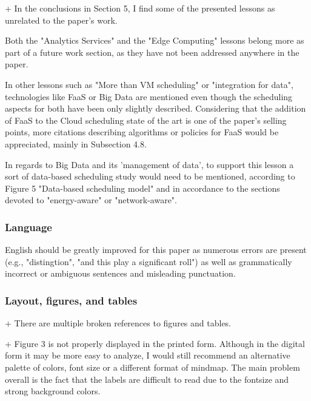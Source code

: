 + In the conclusions in Section 5, I find some of the presented lessons as unrelated to the paper's work.

Both the "Analytics Services" and the "Edge Computing" lessons belong more as part of a future work section, as they have not been addressed anywhere in the paper.



In other lessons such as "More than VM scheduling" or "integration for data", technologies like FaaS or Big Data are mentioned even though the scheduling aspects for both have been only slightly described. Considering that the addition of FaaS to the Cloud scheduling state of the art is one of the paper's selling points, more citations describing algorithms or policies for FaaS would be appreciated, mainly in Subsection 4.8.


In regards to Big Data and its 'management of data', to support this lesson a sort of data-based scheduling study would need to be mentioned, according to Figure 5 "Data-based scheduling model" and in accordance to the sections devoted to "energy-aware" or "network-aware".




\subsubsection{Language}

English should be greatly improved for this paper as numerous errors are present (e.g., "distingtion", "and this play a significant roll") as well as grammatically incorrect or ambiguous sentences and misleading punctuation.



\subsubsection{Layout, figures, and tables}

+ There are multiple broken references to figures and tables.


+ Figure 3 is not properly displayed in the printed form. Although in the digital form it may be more easy to analyze, I would still recommend an alternative palette of colors, font size or a different format of mindmap. The main problem overall is the fact that the labels are difficult to read due to the fontsize and strong background colors.



